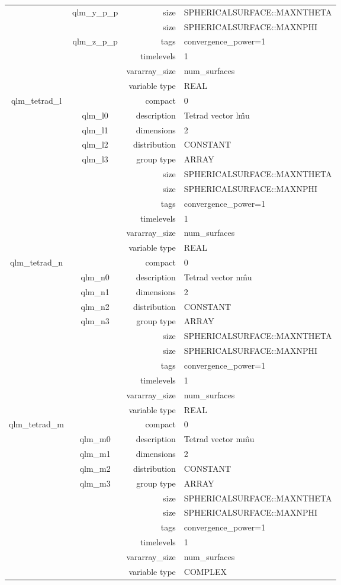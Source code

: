 \begin{tabular*}{150mm}{|c|c@{\extracolsep{\fill}}|rl|}
 & qlm\_y\_p\_p & size & SPHERICALSURFACE::MAXNTHETA \\ 
& ~ & size & SPHERICALSURFACE::MAXNPHI \\ 
 & qlm\_z\_p\_p & tags & convergence\_power=1 \\ 
 &  & timelevels & 1 \\ 
 &  & vararray\_size & num\_surfaces \\ 
 &  & variable type & REAL \\ 
\hline 
qlm\_tetrad\_l &  & compact & 0 \\ 
 & qlm\_l0 & description & Tetrad vector l\^mu \\ 
 & qlm\_l1 & dimensions & 2 \\ 
 & qlm\_l2 & distribution & CONSTANT \\ 
 & qlm\_l3 & group type & ARRAY \\ 
 &  & size & SPHERICALSURFACE::MAXNTHETA \\ 
& ~ & size & SPHERICALSURFACE::MAXNPHI \\ 
 &  & tags & convergence\_power=1 \\ 
 &  & timelevels & 1 \\ 
 &  & vararray\_size & num\_surfaces \\ 
 &  & variable type & REAL \\ 
\hline 
qlm\_tetrad\_n &  & compact & 0 \\ 
 & qlm\_n0 & description & Tetrad vector n\^mu \\ 
 & qlm\_n1 & dimensions & 2 \\ 
 & qlm\_n2 & distribution & CONSTANT \\ 
 & qlm\_n3 & group type & ARRAY \\ 
 &  & size & SPHERICALSURFACE::MAXNTHETA \\ 
& ~ & size & SPHERICALSURFACE::MAXNPHI \\ 
 &  & tags & convergence\_power=1 \\ 
 &  & timelevels & 1 \\ 
 &  & vararray\_size & num\_surfaces \\ 
 &  & variable type & REAL \\ 
\hline 
qlm\_tetrad\_m &  & compact & 0 \\ 
 & qlm\_m0 & description & Tetrad vector m\^mu \\ 
 & qlm\_m1 & dimensions & 2 \\ 
 & qlm\_m2 & distribution & CONSTANT \\ 
 & qlm\_m3 & group type & ARRAY \\ 
 &  & size & SPHERICALSURFACE::MAXNTHETA \\ 
& ~ & size & SPHERICALSURFACE::MAXNPHI \\ 
 &  & tags & convergence\_power=1 \\ 
 &  & timelevels & 1 \\ 
 &  & vararray\_size & num\_surfaces \\ 
 &  & variable type & COMPLEX \\ 
\hline 
\end{tabular*} 



